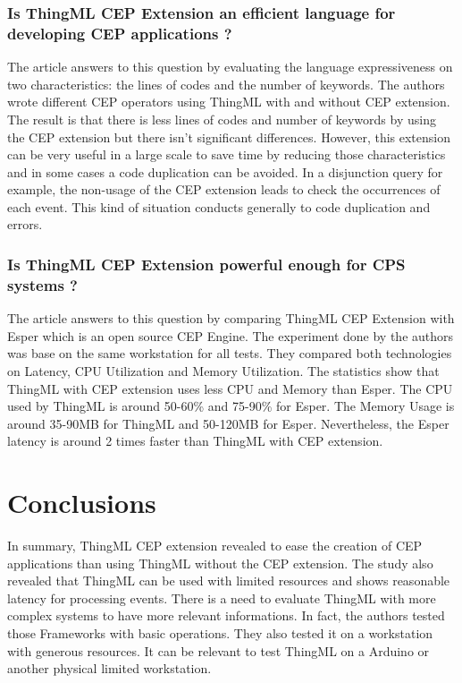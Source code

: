 \documentclass{article}
\begin{document}
\subsubsection{Is ThingML CEP Extension an efficient language for developing CEP applications ? }

The article answers to this question by evaluating the language expressiveness on two characteristics: the lines of codes and the number of keywords. The authors wrote different CEP operators using ThingML with and without CEP extension. The result is that there is less lines of codes and number of keywords by using the CEP extension but there isn't significant differences. However, this extension can be very useful in a large scale to save time by reducing those characteristics and in some cases a code duplication can be avoided. In a disjunction query for example, the non-usage of the CEP extension leads to check the occurrences of each event. This kind of situation conducts generally to code duplication and errors.

\subsubsection{Is ThingML CEP Extension powerful enough for CPS systems ? }

The article answers to this question by comparing ThingML CEP Extension with Esper which is an open source CEP Engine. The experiment done by the authors was base on the same workstation for all tests. They compared both technologies on Latency, CPU Utilization and Memory Utilization. The statistics show that ThingML with CEP extension uses less CPU and Memory than Esper. The CPU used by ThingML is around 50-60\% and 75-90\% for Esper. The Memory Usage is around 35-90MB for ThingML and 50-120MB for Esper. Nevertheless, the Esper latency is around 2 times faster than ThingML with CEP extension.


\section{Conclusions}

In summary, ThingML CEP extension revealed to ease the creation of CEP applications than using ThingML without the CEP extension. The study also revealed that ThingML can be used with limited resources and shows reasonable latency for processing events. There is a need to evaluate ThingML with more complex systems to have more relevant informations. In fact, the authors tested those Frameworks with basic operations. They also tested it on a workstation with generous resources. It can be relevant to test ThingML on a Arduino or another physical limited workstation. 

\listoffigures

\printbibliography
\end{document}
